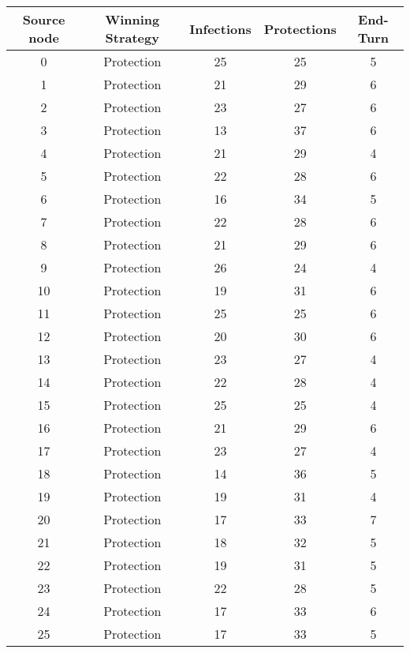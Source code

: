 \documentclass[results.tex]{subfiles}
\begin{document}
\begin{center}
  \begin{tabular}{| c || c | c | c | c |}
    \hline
    {\bfseries Source node} & {\bfseries Winning Strategy} & {\bfseries Infections} & {\bfseries Protections} & {\bfseries End-Turn} \\  %
    \hline\hline
    0 & Protection & 25 & 25 & 5 \\ 
    \hline
    1 & Protection & 21 & 29 & 6 \\ 
    \hline
    2 & Protection & 23 & 27 & 6 \\ 
    \hline
    3 & Protection & 13 & 37 & 6 \\ 
    \hline
    4 & Protection & 21 & 29 & 4 \\ 
    \hline
    5 & Protection & 22 & 28 & 6 \\ 
    \hline
    6 & Protection & 16 & 34 & 5 \\ 
    \hline
    7 & Protection & 22 & 28 & 6 \\ 
    \hline
    8 & Protection & 21 & 29 & 6 \\ 
    \hline
    9 & Protection & 26 & 24 & 4 \\ 
    \hline
    10 & Protection & 19 & 31 & 6 \\ 
    \hline
    11 & Protection & 25 & 25 & 6 \\ 
    \hline
    12 & Protection & 20 & 30 & 6 \\ 
    \hline
    13 & Protection & 23 & 27 & 4 \\ 
    \hline
    14 & Protection & 22 & 28 & 4 \\ 
    \hline
    15 & Protection & 25 & 25 & 4 \\ 
    \hline
    16 & Protection & 21 & 29 & 6 \\ 
    \hline
    17 & Protection & 23 & 27 & 4 \\ 
    \hline
    18 & Protection & 14 & 36 & 5 \\ 
    \hline
    19 & Protection & 19 & 31 & 4 \\ 
    \hline
    20 & Protection & 17 & 33 & 7 \\ 
    \hline
    21 & Protection & 18 & 32 & 5 \\ 
    \hline
    22 & Protection & 19 & 31 & 5 \\ 
    \hline
    23 & Protection & 22 & 28 & 5 \\ 
    \hline
    24 & Protection & 17 & 33 & 6 \\ 
    \hline
    25 & Protection & 17 & 33 & 5 \\ 

\end{tabular}
\end{center}
\end{document}
